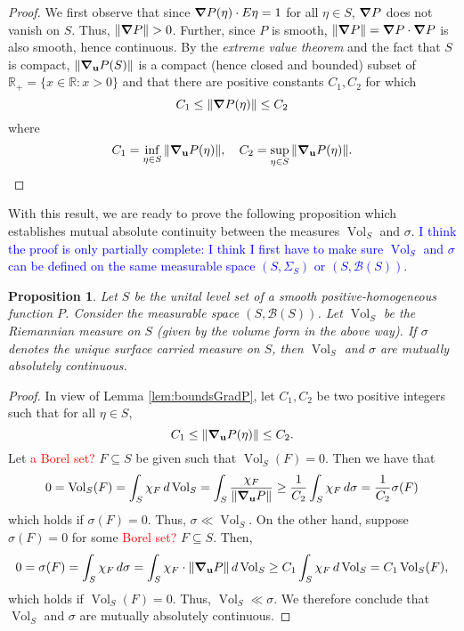 \documentclass{article}
\newcommand{\R}{\mathbb{R}}
\newcommand{\f}[2]{\frac{#1}{#2}}
\theoremstyle{theorem}
\newtheorem{proposition}[theorem]{Proposition}
\newcommand{\Vol}{\operatorname{Vol}}
\begin{document}
\begin{proof}
We first observe that since $\grad P(\eta) \cdot E\eta = 1$ for all $\eta\in S$, $\grad P$ does not vanish on $S$. Thus, $\norm{\grad P} > 0$. Further, since $P$ is smooth, $\norm{\grad P} = \grad P \cdot \grad P$ is also smooth, hence continuous. By the \textit{extreme value theorem} and the fact that $S$ is compact, $\norm{\grad_{\mathbf{u}} P(S) }$ is a compact (hence closed and bounded) subset of $\R_+ = \{ x \in \R : x > 0 \}$ and that there are positive constants $C_1,C_2$ for which 
\begin{equation*}
    C_1 \leq \norm{\grad P(\eta)} \leq C_2
\end{equation*}
where
\begin{equation*}
    C_1 = \inf_{\eta\in S}\norm{\grad_{\mathbf{u}} P(\eta) }, \quad C_2 = \sup_{\eta\in S}\norm{\grad_{\mathbf{u}} P(\eta) }.
\end{equation*}
\end{proof}

With this result, we are ready to prove the following proposition which establishes mutual absolute continuity between the measures $\Vol_S$ and $\sigma$. \textcolor{blue}{I think the proof is only partially complete: I think I first have to make sure $\Vol_S$ and $\sigma$ can be defined on the same measurable space $(S,\Sigma_S)$ or $(S,\mathcal{B}(S))$}.

\begin{proposition}
Let $S$ be the unital level set of a smooth positive-homogeneous function $P$. Consider the measurable space $(S,\mathcal{B}(S))$. Let $\Vol_S$ be the Riemannian measure on $S$ (given by the volume form in the above way). If $\sigma$ denotes the unique surface carried measure on $S$, then $\Vol_S$ and $\sigma$ are mutually absolutely continuous.
\end{proposition}

\begin{proof}
In view of Lemma \ref{lem:boundsGradP}, let $C_1,C_2$ be two positive integers such that for all $\eta\in S$, 
\begin{equation*}
    C_1 \leq \norm{\grad_{\mathbf{u}} P(\eta) } \leq C_2.
\end{equation*}
Let \textcolor{red}{a Borel set?} $F\subseteq S$ be given such that $\Vol_S(F) = 0$. Then we have that
\begin{equation*}
    0 = \Vol_S(F) = \int_S \chi_F \,d\Vol_S = \int_S \f{\chi_F}{\norm{\grad_{\mathbf{u}} P }} \geq \f{1}{C_2}\int_S \chi_F \,d\sigma = \f{1}{C_2}\sigma(F)
\end{equation*}
which holds if $\sigma(F) = 0$. Thus, $\sigma \ll \Vol_S$. On the other hand, suppose $\sigma(F) = 0$ for some \textcolor{red}{Borel set?} $F \subseteq S$. Then,
\begin{equation*}
    0 = \sigma(F) = \int_S \chi_F \,d\sigma= \int_S \chi_F \cdot \norm{\grad_{\mathbf{u}} P } \,d\Vol_S \geq C_1 \int_S \chi_F \,d\Vol_S = C_1 \Vol_S(F),
\end{equation*}
which holds if $\Vol_S(F) = 0$. Thus, $\Vol_S \ll \sigma$. We therefore conclude that $\Vol_S$ and $\sigma$ are mutually absolutely continuous.
\end{proof}
\end{document}
